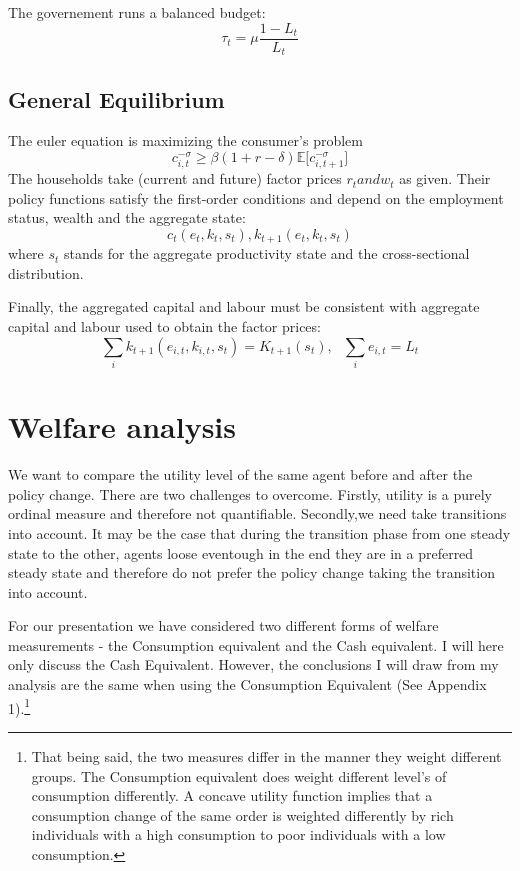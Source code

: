 \documentclass[a4paper,12pt]{article}
\begin{document}
The governement runs a balanced budget:
\[
\tau_{t}=\mu\frac{1-L_{t}}{L_{t}}
\]

\subsection{General Equilibrium}

The euler equation is maximizing the consumer's problem
\[ 
c_{i,t}^{- \sigma} \geq \beta (1+r -\delta){\mathbb{E}[c_{i,t+1}^{- \sigma}}]
\]
The households take (current and future) factor prices $r_{t} and w_{t}$ as given. Their policy functions satisfy the first-order conditions and depend on the employment status, wealth and the aggregate state: 
\[ c_{t}(e_{t},k_{t},s_{t}), k_{t+1}(e_{t},k_{t},s_{t})
\]
where $s_{t}$ stands for the aggregate productivity state and the cross-sectional distribution. 

Finally, the aggregated capital and labour must be consistent with aggregate capital and labour used to obtain the factor prices: 
\[ \sum_{i}k_{t+1}(e_{i,t},k_{i,t},s_{t})=K_{t+1}(s_{t}), \ \ \ \sum_{i}e_{i,t}=L_{t} 
\]

\section{Welfare analysis}
We want to compare the utility level of the same agent before and after the policy change. There are two challenges to overcome. Firstly, utility is a purely ordinal measure and therefore not quantifiable. Secondly,we need take transitions into account. It may be the case that during the transition phase from one steady state to the other, agents loose eventough in the end they are in a preferred steady state and therefore do not prefer the policy change taking the transition into account. 

For our presentation we have considered two different forms of welfare measurements - the Consumption equivalent and the Cash equivalent. I will here only discuss the Cash Equivalent. However, the conclusions I will draw from my analysis are the same when using the Consumption Equivalent (See Appendix 1).\footnote{That being said, the two measures differ in the manner they weight different groups. The Consumption equivalent does weight different level's of consumption differently. A concave utility function implies that a consumption change of the same order is weighted differently by rich individuals with a high consumption to poor individuals with a low consumption.} 
\end{document}
